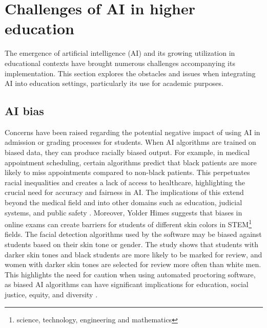 \section{Challenges of AI in higher education}
The emergence of artificial intelligence (AI) and its growing utilization in educational
contexts have brought numerous challenges accompanying its implementation.  This section explores the obstacles
and issues when integrating AI into education settings, particularly its use for academic purposes.
\subsection{AI bias}
Concerns have been raised regarding the potential negative impact of using AI in admission or grading processes for students.
When AI algorithms are trained on biased data, they can produce racially biased output. For example, in medical appointment
scheduling, certain algorithms predict that black patients are more likely to miss appointments compared to non-black patients.
This perpetuates racial inequalities and creates a lack of access to healthcare, highlighting the crucial need for accuracy and
fairness in AI. The implications of this extend beyond the medical field and into other domains
such as education, judicial systems, and public safety \citep{shanklin_ethical_2022}.
Moreover, Yolder Himes suggests that biases in online exams can create barriers for students of different skin colors in STEM\footnote{science, technology, engineering and mathematics}
fields.  The facial detection algorithms used by the software may be biased against students based on their skin tone or gender. The study shows
that students with darker skin tones and black students are more likely to be marked for review, and women with darker skin tones are
selected for review more often than white men. This highlights the need for caution when using automated proctoring software, as biased
AI algorithms can have significant implications for education, social justice, equity, and diversity \citep{yoder-himes_racial_2022}.



